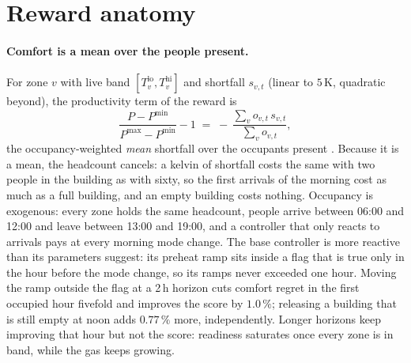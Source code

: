 \providecommand{\pending}[1]{\textcolor{red}{[pending: #1]}}
\providecommand{\e}[1]{\times10^{-#1}}

\section{Reward anatomy}
\label{sec:anatomy}

\paragraph{Comfort is a mean over the people present.} For zone $v$
with live band $[T^{\text{lo}}_v,T^{\text{hi}}_v]$ and shortfall $s_{v,t}$ (linear to
$5$\,K, quadratic beyond), the productivity term of the reward is
\begin{equation}
\frac{P-P^{\min}}{P^{\max}-P^{\min}}-1
\;=\;-\,\frac{\sum_v o_{v,t}\,s_{v,t}}{\sum_v o_{v,t}},
\label{eq:mean}
\end{equation}
the occupancy-weighted \emph{mean} shortfall over the occupants present
\citep{goldfeder2026smart}. Because it is a mean, the headcount cancels: a kelvin of shortfall
costs the same with two people in the building as with sixty, so the first arrivals of the
morning cost as much as a full building, and an empty building costs nothing. Occupancy is
exogenous: every zone holds the same headcount, people arrive between 06:00 and 12:00 and leave
between 13:00 and 19:00, and a controller that only reacts to arrivals pays at every morning
mode change. %
The base controller is more reactive than its parameters suggest: its preheat ramp sits inside a
flag that is true only in the hour before the mode change, so its ramps never exceeded one hour.
Moving the ramp outside the flag at a 2\,h horizon cuts comfort regret in the first occupied hour
fivefold and improves the score by $1.0\,\%$; releasing a building that is still empty at noon
adds $0.77\,\%$ more, independently. Longer horizons keep improving that hour but not the score:
readiness saturates once every zone is in band, while the gas keeps growing. %


